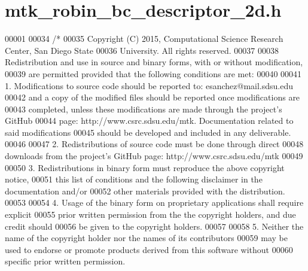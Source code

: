 \hypertarget{mtk__robin__bc__descriptor__2d_8h_source}{\section{mtk\+\_\+robin\+\_\+bc\+\_\+descriptor\+\_\+2d.\+h}
\label{mtk__robin__bc__descriptor__2d_8h_source}
}

\begin{DoxyCode}
00001 
00034 \textcolor{comment}{/*}
00035 \textcolor{comment}{Copyright (C) 2015, Computational Science Research Center, San Diego State}
00036 \textcolor{comment}{University. All rights reserved.}
00037 \textcolor{comment}{}
00038 \textcolor{comment}{Redistribution and use in source and binary forms, with or without modification,}
00039 \textcolor{comment}{are permitted provided that the following conditions are met:}
00040 \textcolor{comment}{}
00041 \textcolor{comment}{1. Modifications to source code should be reported to: esanchez@mail.sdsu.edu}
00042 \textcolor{comment}{and a copy of the modified files should be reported once modifications are}
00043 \textcolor{comment}{completed, unless these modifications are made through the project's GitHub}
00044 \textcolor{comment}{page: http://www.csrc.sdsu.edu/mtk. Documentation related to said modifications}
00045 \textcolor{comment}{should be developed and included in any deliverable.}
00046 \textcolor{comment}{}
00047 \textcolor{comment}{2. Redistributions of source code must be done through direct}
00048 \textcolor{comment}{downloads from the project's GitHub page: http://www.csrc.sdsu.edu/mtk}
00049 \textcolor{comment}{}
00050 \textcolor{comment}{3. Redistributions in binary form must reproduce the above copyright notice,}
00051 \textcolor{comment}{this list of conditions and the following disclaimer in the documentation and/or}
00052 \textcolor{comment}{other materials provided with the distribution.}
00053 \textcolor{comment}{}
00054 \textcolor{comment}{4. Usage of the binary form on proprietary applications shall require explicit}
00055 \textcolor{comment}{prior written permission from the the copyright holders, and due credit should}
00056 \textcolor{comment}{be given to the copyright holders.}
00057 \textcolor{comment}{}
00058 \textcolor{comment}{5. Neither the name of the copyright holder nor the names of its contributors}
00059 \textcolor{comment}{may be used to endorse or promote products derived from this software without}
00060 \textcolor{comment}{specific prior written permission.}

\end{DoxyCode}
